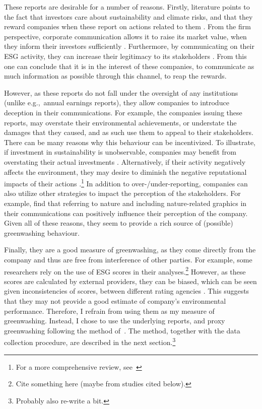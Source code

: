 \documentclass[12pt]{article}
\begin{document}
These reports are desirable for a number of reasons. Firstly, literature points to the fact that investors care about sustainability and climate risks, and that they reward companies when these report on actions related to them \parencite{ilhanClimateRiskDisclosure2023,kruegerImportanceClimateRisks2020,pastorSustainableInvestingEquilibrium2021,testaDoesItPay2018}. From the firm perspective, corporate communication allows it to raise its market value, when they inform their investors sufficiently \parencite{servaesImpactCorporateSocial2013}. Furthermore, by communicating on their ESG activity, they can increase their legitimacy to its stakeholders \parencite{torelliGreenwashingEnvironmentalCommunication2020}. From this one can conclude that it is in the interest of these companies, to communicate as much information as possible through this channel, to reap the rewards. 

However, as these reports do not fall under the oversight of any institutions (unlike e.g.,~annual earnings reports), they allow companies to introduce deception in their communications. For example, the companies issuing these reports, may overstate their environmental achievements, or understate the damages that they caused, and as such use them to appeal to their stakeholders. There can be many reasons why this behaviour can be incentivized. To illustrate, if investment in sustainability is unobservable, companies may benefit from overstating their actual investments \parencite{wuBadGreenwashingGood2020}. Alternatively, if their activity negatively affects the environment, they may desire to diminish the negative reputational impacts of their actions \parencite{marquisScrutinyNormsSelective2016, binglerCheapTalkCherrypicking2022}.\footnote{For a more comprehensive review, see~\cite{kimGreenwashVsBrownwash2015}} In addition to over-/under-reporting, companies can also utilize other strategies to impact the perception of the stakeholders. For example, \textcite{parguelCanEvokingNature2015,schmuckMisleadingConsumersGreen2018} find that referring to nature and including nature-related graphics in their communications can positively influence their perception of the company. Given all of these reasons, they seem to provide a rich source of (possible) greenwashing behaviour.


Finally, they are a good measure of greenwashing, as they come directly from the company and thus are free from interference of other parties. For example, some researchers rely on the use of ESG scores in their analyses.\footnote{Cite something here (maybe from studies cited below).} However, as these scores are calculated by external providers, they can be biased, which can be seen given inconsistencies of scores, between different rating agencies \parencite{bergAggregateConfusionDivergence2022, chatterjiRatingsFirmsConverge2016}. This suggests that they may not provide a good estimate of company's environmental performance. Therefore, I refrain from using them as my measure of greenwashing. Instead, I chose to use the underlying reports, and proxy greenwashing following the method of~\cite{binglerHowCheapTalk2024}. The method, together with the data collection procedure, are described in the next section.\footnote{Probably also re-write a bit.}
\end{document}
